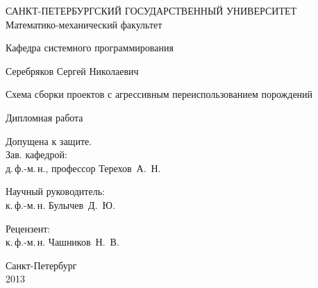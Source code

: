 %
%
\thispagestyle{empty}
\begin{center}
САНКТ-ПЕТЕРБУРГСКИЙ ГОСУДАРСТВЕННЫЙ УНИВЕРСИТЕТ\\
Математико-механический факультет\\
\end{center}

\begin{center}
Кафедра системного программирования\\
\end{center}
\vspace{2cm}
\begin{center}
    \large{Серебряков Сергей Николаевич}
\end{center}
\begin{center}
    \LARGE{Схема сборки проектов с агрессивным переиспользованием порождений} \\
\end{center}
\begin{center}
    \normalsize{Дипломная работа}
\end{center}
\vspace{3cm}
\noindent
\begin{flushright}
    Допущена к защите. \\
	Зав. кафедрой: \\
	д.\,ф.-м.\,н., профессор Терехов~А.~Н.
\end{flushright}
\vspace{1cm}
\begin{flushright}
	Научный руководитель: \\
	к.\,ф.-м.\,н. Булычев~Д.~Ю.
\end{flushright}
\vspace{1cm}
\begin{flushright}
	Рецензент: \\
	к.\,ф.-м.\,н. Чашников~Н.~В.
\end{flushright}
\vspace{\fill}
\begin{center}
    \small
    Санкт-Петербург\\2013
\end{center}

